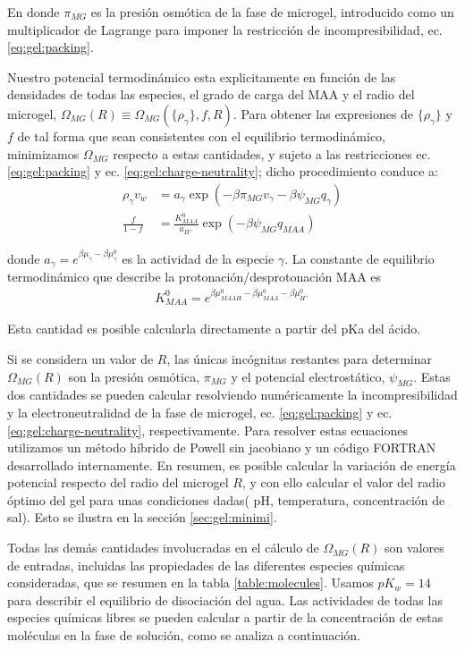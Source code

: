 \noindent En donde $\pi_{MG}$ es la presi\'on osm\'otica de la fase de microgel, introducido como un multiplicador de Lagrange para imponer la restricci\'on de incompresibilidad, ec. \ref{eq:gel:packing}.


Nuestro potencial termodin\'amico esta explicitamente en funci\'on de las densidades de todas las especies, el grado de carga del MAA y el radio del microgel, $\Omega_{MG}(R)\equiv\Omega_{MG}(\{\rho_\gamma\},f,R)$.
Para obtener las expresiones de $\{\rho_\gamma\}$ y $f$ de tal forma que sean consistentes con el equilibrio termodin\'amico, minimizamos $\Omega_{MG}$ respecto a estas cantidades, y  sujeto a las restricciones ec. \ref{eq:gel:packing} y ec. \ref{eq:gel:charge-neutrality}; dicho procedimiento conduce a: 
%
%
\begin{align}
\rho_\gamma v_w &= a_\gamma \exp(-\beta\pi_{MG}v_\gamma -\beta\psi_{MG}q_{\gamma})\\
\frac{f}{1-f}&= \frac{K^0_{MAA}}{a_{H^+}}\exp(-\beta\psi_{MG}q_{MAA})\label{eq:fcharge}
\end{align}

\noindent donde $a_\gamma = e^{\beta\mu_\gamma-\beta\mu_\gamma^0}$ es la actividad de la especie $\gamma$. 
La constante de equilibrio termodin\'amico que describe la protonaci\'on/desprotonaci\'on MAA es
%
%
\begin{align}
K^0_{MAA}= e^{\beta\mu^0_{MAAH}-\beta\mu^0_{MAA}-\beta\mu^0_{H^+}}
\end{align}

\noindent Esta cantidad es posible calcularla directamente a partir del pKa del \'acido.


Si se considera  un valor de  $R$, las \'unicas inc\'ognitas restantes para determinar $\Omega_{MG}(R)$ son la presi\'on osm\'otica, $\pi_{MG}$ y el potencial electrost\'atico, $\psi_{MG}$.
Estas dos cantidades se pueden calcular resolviendo num\'ericamente la incompresibilidad y la electroneutralidad de la fase de microgel, ec. \ref{eq:gel:packing} y ec. \ref{eq:gel:charge-neutrality}, respectivamente.
Para resolver estas ecuaciones utilizamos un m\'etodo h\'ibrido de Powell sin jacobiano y un c\'odigo FORTRAN desarrollado internamente.
En resumen, es posible calcular la variaci\'on de energ\'ia potencial respecto del radio del microgel $R$, y con ello calcular el valor del radio \'optimo del gel para unas condiciones dadas( pH, temperatura, concentraci\'on de sal). Esto se ilustra en la secci\'on \ref{sec:gel:minimi}.

Todas las dem\'as cantidades involucradas en el c\'alculo de $\Omega_{MG}(R)$ son valores de  entradas, incluidas las propiedades de las diferentes especies qu\'imicas consideradas, que se resumen en la tabla \ref{table:molecules}.
Usamos $pK_w=14$ para describir el equilibrio de disociaci\'on del agua.
Las actividades de todas las especies qu\'imicas libres se pueden calcular a partir de la concentraci\'on de estas mol\'eculas en la fase de soluci\'on, como se analiza a continuaci\'on.


